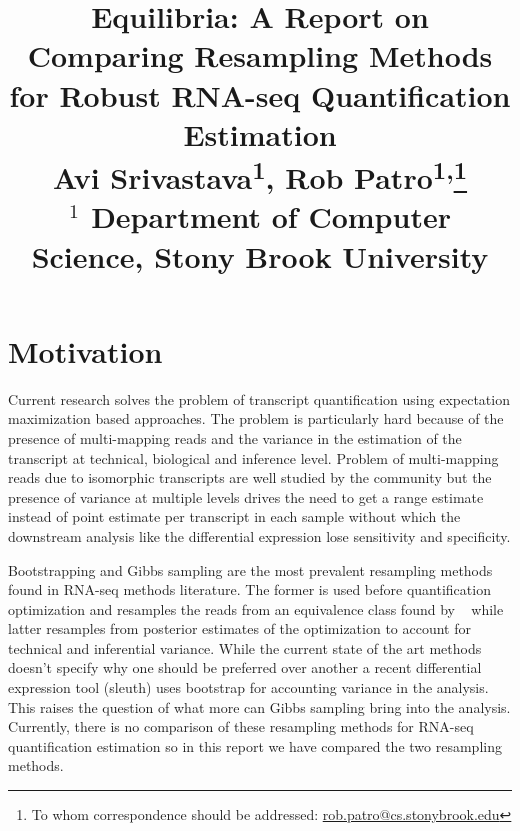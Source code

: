 \documentclass{article}
\begin{document}


\title{{Equilibria: A Report on Comparing Resampling Methods for Robust RNA-seq Quantification Estimation}\\ \bigskip 
\normalsize
Avi Srivastava\textsuperscript{1},
Rob Patro\textsuperscript{1,}\footnote{To whom correspondence should be addressed: \href{mailto:rob.patro@cs.stonybrook.edu}{rob.patro@cs.stonybrook.edu}}\\
\flushleft
$^{1}$ Department of Computer Science, Stony Brook University \\}

\date{}

\maketitle
{}

\section{Motivation}
Current research solves the problem of transcript quantification using expectation maximization based approaches.
The problem is particularly hard because of the presence of multi-mapping reads and the variance in the estimation 
of the transcript at technical, biological and inference level. Problem of multi-mapping reads due to isomorphic transcripts
are well studied by the community but the presence of variance at multiple levels drives the need to get a range estimate 
instead of point estimate per transcript in each sample without which the downstream analysis like the differential expression 
lose sensitivity and specificity.

Bootstrapping and Gibbs sampling are the most prevalent resampling methods found in RNA-seq methods literature. The former is used
before quantification optimization and resamples the reads from an equivalence class found by ~\citep{Patro2016Salmon} while latter resamples from
posterior estimates of the optimization to account for technical and inferential variance. While the current state of the art methods doesn't
specify why one should be preferred over another a recent differential expression tool (sleuth) uses bootstrap for accounting
variance in the analysis. This raises the question of what more can Gibbs sampling bring into the analysis. Currently, there is no
comparison of these resampling methods for RNA-seq quantification estimation so in this report we have compared the two resampling methods.
\end{document}
